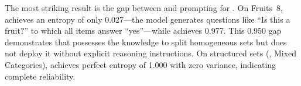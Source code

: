 \begin{table}[t]
    \centering
    \caption{Binary entropy (mean $\pm$ std) for \gptmini across prompt strategies. Best result per dataset in \textbf{bold}.}
    \label{tab:entropy_mini}
\end{table}

The most striking result is the gap between \basic and \chainofthought prompting for \gptfull.
On Fruits~8, \basic achieves an entropy of only 0.027---the model generates questions like ``Is this a fruit?'' to which all items answer ``yes''---while \chainofthought achieves 0.977.
This 0.950 gap demonstrates that \gptfull possesses the knowledge to split homogeneous sets but does not deploy it without explicit reasoning instructions.
On structured sets (, Mixed Categories), \chainofthought achieves perfect entropy of 1.000 with zero variance, indicating complete reliability.

